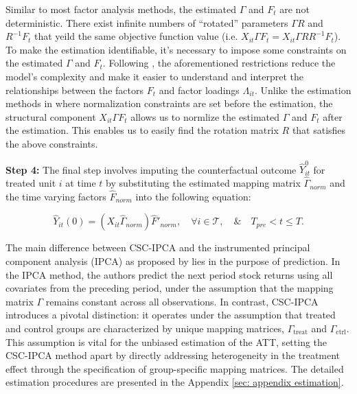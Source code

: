 \documentclass[12pt]{article}
\begin{document}
Similar to most factor analysis methods, the estimated $\Gamma$ and $F_t$ are not deterministic. There exist infinite numbers of ``rotated'' parameters $\Gamma R$ and $R^{-1}F_t$ that yeild the same objective function value (i.e. $X_{it}\Gamma F_t = X_{it} \Gamma R R^{-1} F_t$). To make the estimation identifiable, it's necessary to impose some constraints on the estimated $\Gamma$ and $F_t$. Following \cite{connor1993test, stock2002forecasting, bai2002determining}, the aforementioned restrictions reduce the model's complexity and make it easier to understand and interpret the relationships between the factors $F_t$ and factor loadings $\Lambda_{it}$. Unlike the estimation methods in \cite{bai2009panel,xu2017generalized} where normalization constraints are set before the estimation, the structural component $X_{it}\Gamma F_t$ allows us to normlize the estimated $\Gamma$ and $F_t$ after the estimation. This enables us to easily find the rotation matrix $R$ that satisfies the above constraints.


\textbf{Step 4:} The final step involves imputing the counterfactual outcome $\hat{Y}_{it}^0$ for treated unit $i$ at time $t$ by substituting the estimated mapping matrix $\hat{\Gamma}_{norm}$ and the time varying factors $\hat{F}_{norm}$ into the following equation:

\begin{equation}
\hat{Y}_{it}(0) = (X_{it} \hat{\Gamma}_{norm}) \hat{F}'_{norm}, \quad \forall i \in \mathcal{T}, \quad \& \quad T_{pre} < t \leq T.
\end{equation}

The main difference between CSC-IPCA and the instrumented principal component analysis (IPCA) as proposed by \cite{kelly2020instrumented} lies in the purpose of prediction. In the IPCA method, the authors predict the next period stock returns using all covariates from the preceding period, under the assumption that the mapping matrix $\Gamma$ remains constant across all observations. In contrast, CSC-IPCA introduces a pivotal distinction: it operates under the assumption that treated and control groups are characterized by unique mapping matrices, $\Gamma_{\text{treat}}$ and $\Gamma_{\text{ctrl}}$. This assumption is vital for the unbiased estimation of the ATT, setting the CSC-IPCA method apart by directly addressing heterogeneity in the treatment effect through the specification of group-specific mapping matrices. The detailed estimation procedures are presented in the Appendix \ref{sec: appendix estimation}.
\end{document}
